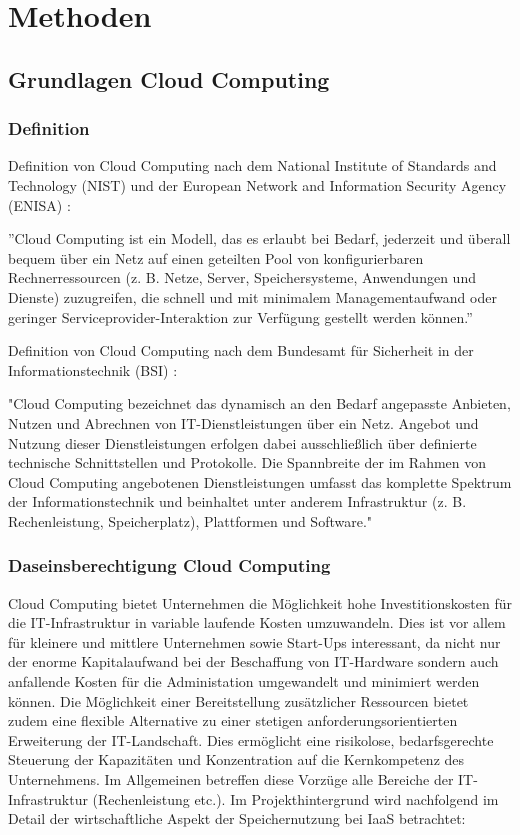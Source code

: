 \documentclass[12pt,a4paper,bibliography=totocnumbered,listof=totocnumbered]{scrartcl}
\begin{document}
\section{Methoden}
\subsection{Grundlagen Cloud Computing}
\subsubsection{Definition}
Definition von Cloud Computing nach dem National Institute of Standards and Technology (NIST) und der European Network and Information Security Agency (ENISA) \cite{34}:

''Cloud Computing ist ein Modell, das es erlaubt bei Bedarf, jederzeit und überall bequem über ein Netz auf einen geteilten Pool von konfigurierbaren Rechnerressourcen (z. B. Netze, Server, Speichersysteme, Anwendungen und Dienste) zuzugreifen, die schnell und mit minimalem Managementaufwand oder geringer Serviceprovider-Interaktion zur Verfügung gestellt werden können.''

Definition von Cloud Computing nach dem Bundesamt für Sicherheit in der Informationstechnik (BSI) \cite{35}:

"Cloud Computing bezeichnet das dynamisch an den Bedarf angepasste Anbieten, Nutzen und Abrechnen von IT-Dienstleistungen über ein Netz. Angebot und Nutzung dieser Dienstleistungen erfolgen dabei ausschließlich über definierte technische Schnittstellen und Protokolle. Die Spannbreite der im Rahmen von Cloud Computing angebotenen Dienstleistungen umfasst das komplette Spektrum der Informationstechnik und beinhaltet unter anderem Infrastruktur (z. B. Rechenleistung, Speicherplatz), Plattformen und Software."

\subsubsection{Daseinsberechtigung Cloud Computing}
Cloud Computing bietet Unternehmen die Möglichkeit hohe Investitionskosten für die IT-Infrastruktur in variable laufende Kosten umzuwandeln. Dies ist vor allem für kleinere und mittlere Unternehmen sowie Start-Ups interessant, da nicht nur der enorme Kapitalaufwand bei der Beschaffung von IT-Hardware sondern auch anfallende Kosten für die Administation umgewandelt und minimiert werden können. Die Möglichkeit einer Bereitstellung zusätzlicher Ressourcen bietet zudem eine flexible Alternative zu einer stetigen anforderungsorientierten Erweiterung der IT-Landschaft. Dies ermöglicht eine risikolose, bedarfsgerechte Steuerung der Kapazitäten und Konzentration auf die Kernkompetenz des Unternehmens. Im Allgemeinen betreffen diese Vorzüge alle Bereiche der IT-Infrastruktur (Rechenleistung etc.). Im Projekthintergrund wird nachfolgend im Detail der wirtschaftliche Aspekt der Speichernutzung bei IaaS betrachtet:
\end{document}
